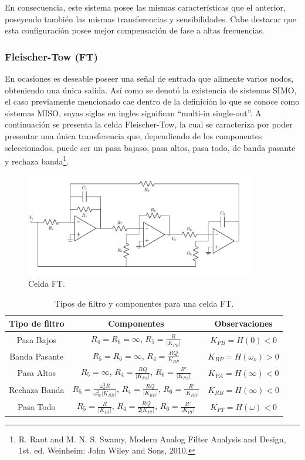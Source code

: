 En consecuencia, este sistema posee las mismas características que el anterior, poseyendo también las mismas transferencias y sensibilidades. Cabe destacar que esta configuración posee mejor compensación de fase a altas frecuencias.

\subsubsection{Fleischer-Tow (FT)}
En ocasiones es deseable poseer una señal de entrada que alimente varios nodos, obteniendo una única salida. Así como se denotó la existencia de sistemas SIMO, el caso previamente mencionado cae dentro de la definición lo que se conoce como sistemas MISO, suyas siglas en ingles significan ``multi-in single-out''. A continuación se presenta la celda Fleischer-Tow, la cual se caracteriza por poder presentar una única transferencia que, dependiendo de los componentes seleccionados, puede ser un pasa bajaso, pasa altos, pasa todo, de banda pasante y rechaza banda\footnote{R. Raut and M. N. S. Swamy, Modern Analog Filter Analysis and Design, 1st. ed. Weinheim: John Wiley and Sons, 2010.}.
\begin{figure}[H]
\centering
	\includegraphics[width=0.9\textwidth]{ImagenesEjercicio4/FT.pdf}
	\caption{Celda FT.}
	\label{fig:FT}
\end{figure}

\begin{table}[H]
\centering
\begin{tabular}{ccc}
\hline
\textbf{Tipo de filtro} & \textbf{Componentes} & \textbf{Observaciones} \\
\hline
Pasa Bajos & $R_4=R_6=\infty$, $R_5=\frac{R}{|K_{PB}|}$ & $K_{PB} = H(0) < 0$ \\
Banda Pasante & $R_5=R_6=\infty$, $R_4=\frac{R Q}{K_{BP}}$ & $K_{BP} = H(\omega_o) > 0$ \\
Pasa Altos & $R_5=\infty$, $R_4 = \frac{R Q}{|K_{PA}|}$, $R_6=\frac{R'}{|K_{PA}|}$ & $K_{PA} = H(\infty) < 0$ \\
Rechaza Banda & $R_5=\frac{\omega_{o}^{2} R}{\omega_{\infty}^{2} |K_{RB}|}$, $R_4 = \frac{R Q}{|K_{RB}|}$, $R_6=\frac{R'}{|K_{RB}|}$ & $K_{RB} = H(\infty) < 0$ \\ %
Pasa Todo & $R_5=\frac{R}{|K_{PT}|}$, $R_4 = \frac{R Q}{2 |K_{PT}|}$, $R_6=\frac{R'}{|K_{PT}|}$ & $K_{PT} = H(\omega) < 0$ \\
\hline
\end{tabular}
\caption{Tipos de filtro y componentes para una celda FT.}
\label{tabla:tiposdefiltroft}
\end{table}

